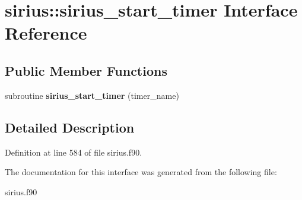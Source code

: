 \hypertarget{interfacesirius_1_1sirius__start__timer}{}\section{sirius\+:\+:sirius\+\_\+start\+\_\+timer Interface Reference}
\label{interfacesirius_1_1sirius__start__timer}
\subsection*{Public Member Functions}
\begin{DoxyCompactItemize}
\item 
\hypertarget{interfacesirius_1_1sirius__start__timer_a03340f1c07d7db805441277836207b92}{}subroutine {\bfseries sirius\+\_\+start\+\_\+timer} (timer\+\_\+name)\label{interfacesirius_1_1sirius__start__timer_a03340f1c07d7db805441277836207b92}

\end{DoxyCompactItemize}


\subsection{Detailed Description}


Definition at line 584 of file sirius.\+f90.



The documentation for this interface was generated from the following file\+:\begin{DoxyCompactItemize}
\item 
sirius.\+f90\end{DoxyCompactItemize}
